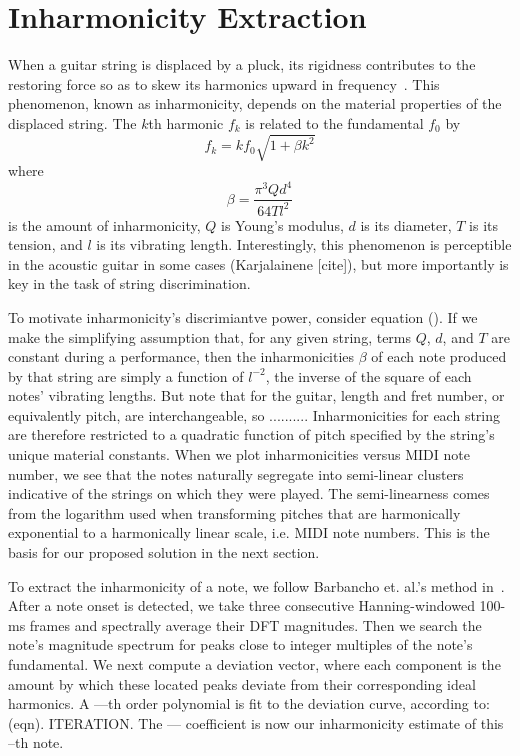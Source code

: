 \documentclass[12pt]{cmuthesis}
\begin{document}
\section{Inharmonicity Extraction}
When a guitar string is displaced by a pluck, its rigidness contributes to the restoring force so as to skew its harmonics upward in frequency~\cite{fletcher1998}. This phenomenon, known as inharmonicity, depends on the material properties of the displaced string. The $k$th harmonic $f_k$ is related to the fundamental $f_0$ by \[f_{k} = kf_{0}\sqrt{1+\beta k^{2}}\] where \[\beta = \frac{\pi^{3}Qd^{4}}{64Tl^{2}}\] is the amount of inharmonicity, $Q$ is Young's modulus, $d$ is its diameter, $T$ is its tension, and $l$ is its vibrating length. Interestingly, this phenomenon is perceptible in the acoustic guitar in some cases (Karjalainene [cite]), but more importantly is key in the task of string discrimination. 

To motivate inharmonicity's discrimiantve power, consider equation (). If we make the simplifying assumption that, for any given string, terms $Q$, $d$, and $T$ are constant during a performance, then the inharmonicities $\beta$ of each note produced by that string are simply a function of $l^{-2}$, the inverse of the square of each notes' vibrating lengths. But note that for the guitar, length and fret number, or equivalently pitch, are interchangeable, so .......... Inharmonicities for each string are therefore restricted to a quadratic function of pitch specified by the string's unique material constants. When we plot inharmonicities versus MIDI note number, we see that the notes naturally segregate into semi-linear clusters indicative of the strings on which they were played. The semi-linearness comes from the logarithm used when transforming pitches that are harmonically exponential to a harmonically linear scale, i.e. MIDI note numbers. This is the basis for our proposed solution in the next section.

To extract the inharmonicity of a note, we follow Barbancho et. al.'s method in~\cite{barbanchoi2012}. After a note onset is detected, we take three consecutive Hanning-windowed 100-ms frames and spectrally average their DFT magnitudes. Then we search the note's magnitude spectrum for peaks close to integer multiples of the note's fundamental. We next compute a deviation vector, where each component is the amount by which these located peaks deviate from their corresponding ideal harmonics. A ---th order polynomial is fit to the deviation curve, according to: (eqn). ITERATION. The --- coefficient is now our inharmonicity estimate of this --th note. 
\end{document}
